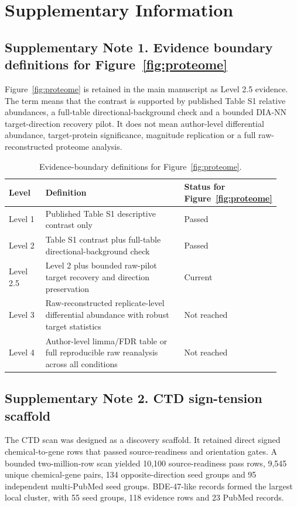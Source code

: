 \documentclass[11pt]{article}
\begin{document}
\clearpage
\appendix
\section*{Supplementary Information}

\subsection*{Supplementary Note 1. Evidence boundary definitions for Figure~\ref{fig:proteome}}
Figure~\ref{fig:proteome} is retained in the main manuscript as Level 2.5 evidence. The term means that the contrast is supported by published Table S1 relative abundances, a full-table directional-background check and a bounded DIA-NN target-direction recovery pilot. It does not mean author-level differential abundance, target-protein significance, magnitude replication or a full raw-reconstructed proteome analysis.

\begin{table}[H]
\centering
\caption{Evidence-boundary definitions for Figure~\ref{fig:proteome}.}
\begin{tabular}{p{0.14\linewidth}p{0.58\linewidth}p{0.20\linewidth}}
\toprule
Level & Definition & Status for Figure~\ref{fig:proteome} \\
\midrule
Level 1 & Published Table S1 descriptive contrast only & Passed \\
Level 2 & Table S1 contrast plus full-table directional-background check & Passed \\
Level 2.5 & Level 2 plus bounded raw-pilot target recovery and direction preservation & Current \\
Level 3 & Raw-reconstructed replicate-level differential abundance with robust target statistics & Not reached \\
Level 4 & Author-level limma/FDR table or full reproducible raw reanalysis across all conditions & Not reached \\
\bottomrule
\end{tabular}
\end{table}

\subsection*{Supplementary Note 2. CTD sign-tension scaffold}
The CTD scan was designed as a discovery scaffold. It retained direct signed chemical-to-gene rows that passed source-readiness and orientation gates. A bounded two-million-row scan yielded 10,100 source-readiness pass rows, 9,545 unique chemical-gene pairs, 134 opposite-direction seed groups and 95 independent multi-PubMed seed groups. BDE-47-like records formed the largest local cluster, with 55 seed groups, 118 evidence rows and 23 PubMed records.
\end{document}
